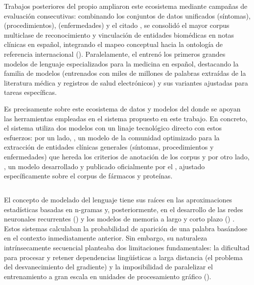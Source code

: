 Trabajos posteriores del propio  ampliaron este ecosistema mediante campañas de evaluación consecutivas: 
combinando los conjuntos de datos unificados  (síntomas),  (procedimientos), 
 (enfermedades) y el citado , se consolidó el mayor corpus multiclase
de reconocimiento y vinculación  de entidades biomédicas en notas clínicas en español, 
integrando el mapeo conceptual hacia la ontología de referencia internacional 
().
Paralelamente, el  entrenó los primeros grandes modelos de lenguaje 
especializados para la medicina en español, destacando la familia de modelos 
(entrenados con miles de millones de palabras extraídas de la literatura médica y registros de salud electrónicos) 
y sus variantes ajustadas para tareas específicas.

% 

Es precisamente sobre este ecosistema de datos y modelos del  donde se apoyan las herramientas empleadas en el 
sistema propuesto en este trabajo. En concreto, el sistema utiliza dos modelos con un linaje tecnológico directo
con estos esfuerzos: por un lado, , un modelo de la comunidad optimizado para la 
extracción de entidades clínicas generales (síntomas, procedimientos y enfermedades) que hereda los criterios de 
anotación de los corpus  y por otro lado, , un modelo 
desarrollado y publicado oficialmente por el , ajustado específicamente sobre el corpus de fármacos y proteínas. 

\subsection{}

El concepto de modelado del lenguaje tiene sus raíces en las aproximaciones estadísticas basadas en n-gramas y, 
posteriormente, en el desarrollo de las redes neuronales recurrentes () y los modelos de memoria 
a largo y corto plazo () . Estos sistemas calculaban la probabilidad de 
aparición de una palabra basándose en el contexto inmediatamente anterior. Sin embargo, su naturaleza intrínsecamente
secuencial planteaba dos limitaciones fundamentales: la dificultad para procesar y retener dependencias lingüísticas a 
larga distancia (el problema del desvanecimiento del gradiente) y la imposibilidad de paralelizar el entrenamiento a gran
escala en unidades de procesamiento gráfico ().

